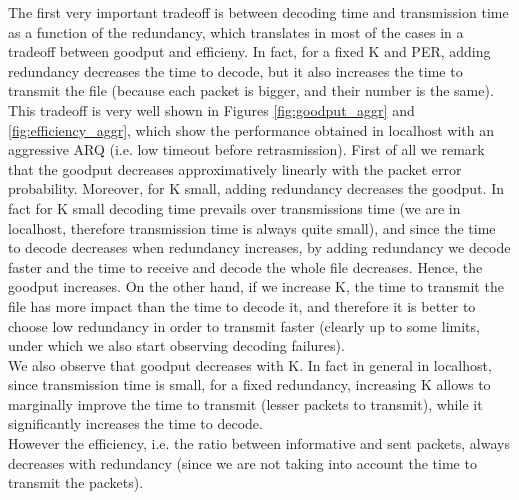 The first very important tradeoff is between decoding time and transmission time as a function of the redundancy, which translates in most of the cases in a tradeoff between goodput and efficieny. In fact, for a fixed K and PER, adding redundancy decreases the time to decode, but it also increases the time to transmit the file (because each packet is bigger, and their number is the same). This tradeoff is very well shown in Figures \ref{fig:goodput_aggr} and \ref{fig:efficiency_aggr}, which show the performance obtained in localhost with an aggressive ARQ (i.e. low timeout before retrasmission). First of all we remark that the goodput decreases approximatively linearly with the packet error probability. Moreover, for K small, adding redundancy decreases the goodput. In fact for K small decoding time prevails over transmissions time (we are in localhost, therefore transmission time is always quite small), and since the time to decode decreases when redundancy increases, by adding redundancy we decode faster and the time to receive and decode the whole file decreases. Hence, the goodput increases. On the other hand, if we increase K, the time to transmit the file has more impact than the time to decode it, and therefore it is better to choose low redundancy in order to transmit faster (clearly up to some limits, under which we also start observing decoding failures).\\
We also observe that goodput decreases with K. In fact in general in localhost, since transmission time is small, for a fixed redundancy, increasing K allows to marginally improve the time to transmit (lesser packets to transmit), while it significantly increases the time to decode. \\
However the efficiency, i.e. the ratio between informative and sent packets, always decreases with redundancy (since we are not taking into account the time to transmit the packets).\\

